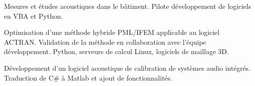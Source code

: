 \documentclass[10pt,a4paper]{altacv}
\begin{document}

Mesures et \'etudes acoustiques dans le b\^atiment. Pilote d\'eveloppement de logiciels en VBA et Python.
\divider

Optimisation d'une m\'ethode hybride PML/IFEM applicable au logiciel ACTRAN.\linebreak
Validation de la m\'ethode en collaboration avec l'\'equipe d\'eveloppement. Python, serveurs de calcul Linux, logiciels de maillage 3D.
\divider

D\'eveloppement d'un logiciel acoustique de calibration de syst\`emes audio int\'egr\'es. Traduction de C\# \`a
Matlab et ajout de fonctionnalit\'es.

\clearpage
\end{document}
